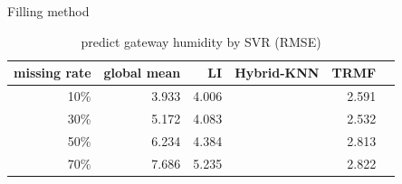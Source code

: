 \begin{table} [htbp]
\centering
\caption{predict gateway humidity by SVR (RMSE) }
\label{table: SVR}
   Filling method
\begin{tabular}{ r | r r r r r}
        missing rate&global mean     &LI   &Hybrid-KNN &TRMF\\ \hline
        10\%    &3.933 &4.006&&2.591\\
        30\%    &5.172&4.083&&2.532\\
        50\%    &6.234&4.384&&2.813\\
        70\%   &7.686&5.235&&2.822\\
  
\end{tabular}
\end{table}
